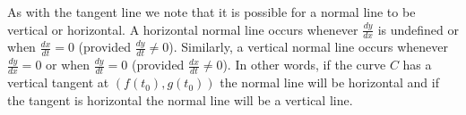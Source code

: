 As with the tangent line we note that it is possible for a normal line to be vertical or horizontal. A horizontal normal line occurs whenever $\frac{dy}{dx}$ is undefined or when $\frac{dx}{dt} = 0$ (provided $\frac{dy}{dt} \neq 0$). Similarly, a vertical normal line occurs whenever $\frac{dy}{dx} = 0$ or when $\frac{dy}{dt} = 0$ (provided $\frac{dx}{dt} \neq 0$). In other words, if the curve $C$ has a vertical tangent  at $(f(t_0), g(t_0))$ the normal line will be horizontal and if the tangent is horizontal the normal line will be a vertical line.


